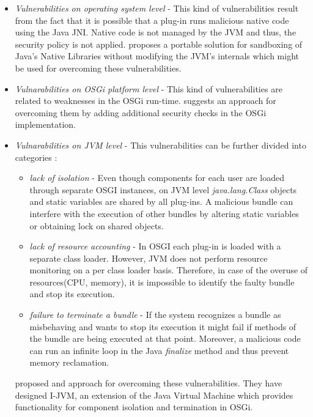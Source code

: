 \begin{itemize}

	\item \textit{Vulnerabilities on operating system level} - This kind of vulnerabilities result from the fact that it is possible that a plug-in runs malicious native code using the Java JNI. Native code is not managed by the JVM and thus, the security policy is not applied. \cite{Sun} proposes a portable solution for sandboxing of Java's Native Libraries without modifying the JVM's internals which might be used for overcoming these vulnerabilities.
	
	\item \textit{Vulnarabilities on OSGi platform level} - This kind of vulnerabilities are related to weaknesses in the OSGi run-time. \cite{Parrend} suggests an approach for overcoming them by adding additional security checks in the OSGi implementation.
	
	\item \textit{Vulnarabilities on JVM level} - This vulnerabilities can be further divided into categories \cite{Geoffray}: 
	
	\begin{itemize}
		\item \textit{lack of isolation} - Even though components for each user are loaded through separate OSGI instances, on JVM level \textit{java.lang.Class} objects and static variables are shared by all plug-ins. A malicious bundle can interfere with the execution of other bundles by altering static variables or obtaining lock on shared objects.
		
		\item \textit{lack of resource accounting} - In OSGI each plug-in is loaded with a separate class loader. However, JVM does not perform resource monitoring on a per class loader basis. Therefore, in case of the overuse of resources(CPU, memory), it is impossible to identify the faulty bundle and stop its execution.
		
		\item \textit{failure to terminate a bundle} -  If the system recognizes a bundle as misbehaving and wants to stop its
execution it might fail if methods of the bundle are being executed at that point. Moreover, a malicious code can run an infinite loop in the Java \textit{finalize} method and thus prevent memory reclamation.
		
	\end{itemize}
	
	\cite{Geoffray} proposed and approach for overcoming these vulnerabilities. They have designed I-JVM, an extension of the Java Virtual Machine which provides functionality for component isolation and termination in OSGi.
	
\end{itemize}

